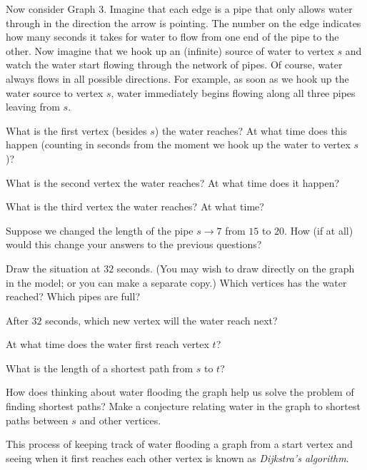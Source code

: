 \documentclass{tufte-handout}
\begin{document}
Now consider Graph 3.  Imagine that each edge is a pipe that only
allows water through in the direction the arrow is pointing.  The
number on the edge indicates how many seconds it takes for water to
flow from one end of the pipe to the other.  Now imagine that we hook
up an (infinite) source of water to vertex $s$ and watch the water
start flowing through the network of pipes.  Of course, water always
flows in all possible directions.  For example, as soon as we hook up
the water source to vertex $s$, water immediately begins flowing
along all three pipes leaving from $s$.
\begin{questions}
  \item What is the first vertex (besides $s$) the water reaches?  At
    what time does this happen (counting in seconds from the moment we
    hook up the water to vertex $s$)?
  \item What is the second vertex the water reaches?  At what time
    does it happen?
  \item What is the third vertex the water reaches?  At what time?
  \item Suppose we changed the length of the pipe $s \to 7$ from $15$
    to $20$.  How (if at all) would this change your answers to the
    previous questions?
  \item Draw the situation at $32$ seconds.  (You may wish to draw
    directly on the graph in the model; or you can make a separate
    copy.)  Which vertices has the water reached?  Which pipes are
    full?
  \item After $32$ seconds, which new vertex will the water reach
    next?
  \item At what time does the water first reach vertex $t$?
  \item What is the length of a shortest path from $s$ to $t$?
  \item How does thinking about water flooding the graph help us solve
    the problem of finding shortest paths?  Make a conjecture relating water in
    the graph to shortest paths between $s$ and other vertices.
\end{questions}

\pause

This process of keeping track of water flooding a graph from a start
  vertex and seeing when it first reaches each other vertex is known as
  \emph{Dijkstra's algorithm}.
\end{document}
